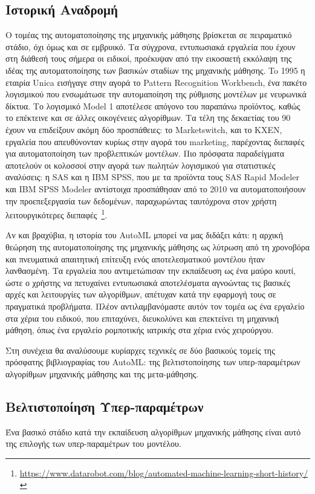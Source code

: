  \subsection{Ιστορική Αναδρομή} \label{section:autohistory}
 Ο τομέας της αυτοματοποίησης της μηχανικής μάθησης βρίσκεται σε πειραματικό στάδιο, όχι όμως και σε εμβρυικό. Τα σύγχρονα, εντυπωσιακά εργαλεία που έχουν στη διάθεσή τους σήμερα οι ειδικοί, προέκυψαν από την εικοσαετή εκκόλαψη της ιδέας της αυτοματοποίησης των βασικών σταδίων της μηχανικής μάθησης. To 1995 η εταιρία Unica εισήγαγε στην αγορά το Pattern Recognition Workbench, ένα πακέτο λογισμικού
 που ενσωμάτωσε την αυτομαποίηση της ρύθμισης μοντέλων με νευρωνικά δίκτυα. Το λογισμικό Model 1 αποτέλεσε απόγονο του παραπάνω προϊόντος, καθώς το επέκτεινε και σε άλλες οικογένειες αλγορίθμων. Τα τέλη της δεκαετίας του 90 έχουν να επιδείξουν ακόμη δύο προσπάθειες: το Marketswitch, και το KXEN, εργαλεία που απευθύνονταν κυρίως στην αγορά του marketing, παρέχοντας διεπαφές για αυτοματοποίηση των προβλεπτικών μοντέλων. Πιο πρόσφατα παραδείγματα αποτελούν οι κολοσσοί στην αγορά των πωλητών λογισμικού για στατιστικές αναλύσεις: η SAS και η IBM SPSS, που με τα προϊόντα τους SAS Rapid Modeler και IBM SPSS Modeler αντίστοιχα προσπάθησαν από το 2010 να αυτοματοποιήσουν την προεπεξεργασία των δεδομένων, παραχωρώντας ταυτόχρονα στον χρήστη λειτουργικότερες διεπαφές~\footnote{\url{https://www.datarobot.com/blog/automated-machine-learning-short-history/}}.
 
 Αν και βραχύβια, η ιστορία του AutoML μπορεί να μας διδάξει κάτι: η αρχική θεώρηση της αυτοματοποίησης της μηχανικής μάθησης ως λύτρωση  από τη χρονοβόρα και πνευματικά απαιτητική επίτευξη ενός αποτελεσματικού μοντέλου ήταν λανθασμένη. Τα εργαλεία που αντιμετώπισαν την εκπαίδευση ως ένα μαύρο κουτί, ώστε ο χρήστης να πετυχαίνει εντυπωσιακά αποτελέσματα αγνοώντας τις βασικές αρχές και λειτουργίες των αλγορίθμων, απέτυχαν κατά την εφαρμογή τους σε πραγματικά προβλήματα. Πλέον αντιλαμβανόμαστε αυτόν τον τομέα ως ένα εργαλείο στα χέρια του ειδικού, που επιταχύνει, διευκολύνει και επεκτείνει τη μηχανική μάθηση, όπως ένα  εργαλείο ρομποτικής ιατρικής στα χέρια ενός χειρούργου. 
 
 Στη συνέχεια θα αναλύσουμε κυρίαρχες τεχνικές σε δύο βασικούς τομείς της πρόσφατης βιβλιογραφίας του AutoML: της βελτιστοποίησης των υπερ-παραμέτρων αλγορίθμων μηχανικής μάθησης και της μετα-μάθησης.
 
 \subsection{Βελτιστοποίηση Υπερ-παραμέτρων} \label{section:opt}
 	Ένα βασικό στάδιο κατά την εκπαίδευση αλγορίθμων μηχανικής μάθησης είναι αυτό της επιλογής των υπερ-παραμέτρων του μοντέλου.
 	
